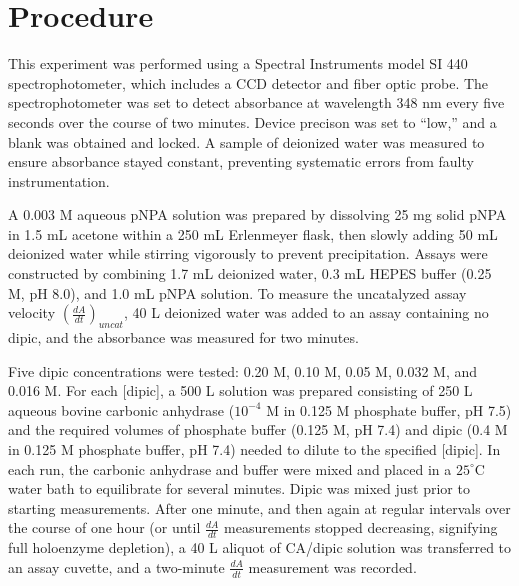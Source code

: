 \section{Procedure}
This experiment was performed using a Spectral Instruments model SI 440 spectrophotometer, which includes a CCD detector and fiber optic probe. The spectrophotometer was set to detect absorbance at wavelength 348 nm every five seconds over the course of two minutes. Device precison was set to ``low,'' and a blank was obtained and locked. A sample of deionized water was measured to ensure absorbance stayed constant, preventing systematic errors from faulty instrumentation.

A 0.003 M aqueous pNPA solution was prepared by dissolving 25 mg solid pNPA in 1.5 mL acetone within a 250 mL Erlenmeyer flask, then slowly adding 50 mL deionized water while stirring vigorously to prevent precipitation. Assays were constructed by combining 1.7 mL deionized water, 0.3 mL HEPES buffer (0.25 M, pH 8.0), and 1.0 mL pNPA solution. To measure the uncatalyzed assay velocity $\left( \frac{dA}{dt} \right)_{uncat}$, 40 {\textmu}L deionized water was added to an assay containing no dipic, and the absorbance was measured for two minutes.

Five dipic concentrations were tested: 0.20 M, 0.10 M, 0.05 M, 0.032 M, and 0.016 M. For each [dipic], a 500 {\textmu}L solution was prepared consisting of 250 {\textmu}L aqueous bovine carbonic anhydrase ($10^{-4}$ M in 0.125 M phosphate buffer, pH 7.5) and the required volumes of phosphate buffer (0.125 M, pH 7.4) and dipic (0.4 M in 0.125 M phosphate buffer, pH 7.4) needed to dilute to the specified [dipic]. In each run, the carbonic anhydrase and buffer were mixed and placed in a $25^{\circ}$C water bath to equilibrate for several minutes. Dipic was mixed just prior to starting measurements. After one minute, and then again at regular intervals over the course of one hour (or until $\frac{dA}{dt}$ measurements stopped decreasing, signifying full holoenzyme depletion), a 40 {\textmu}L aliquot of CA/dipic solution was transferred to an assay cuvette, and a two-minute $\frac{dA}{dt}$ measurement was recorded. 